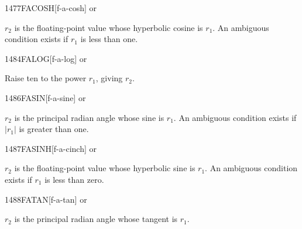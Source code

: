 \begin{newword}{1477}{FACOSH}[f-a-cosh]
	 or

	$r_2$ is the floating-point value whose hyperbolic cosine is
	$r_1$. An ambiguous condition exists if $r_1$ is less than one.
\end{newword}


\begin{newword}{1484}{FALOG}[f-a-log]
	 or

	Raise ten to the power $r_1$, giving $r_2$.
\end{newword}


\begin{newword}{1486}{FASIN}[f-a-sine]
	 or

	$r_2$ is the principal radian angle whose sine is $r_1$. An
	ambiguous condition exists if $|r_1|$ is greater than one.
\end{newword}


\begin{newword}{1487}{FASINH}[f-a-cinch]
	 or

	$r_2$ is the floating-point value whose hyperbolic sine is $r_1$.
	An ambiguous condition exists if $r_1$ is less than zero.
\end{newword}


\begin{newword}{1488}{FATAN}[f-a-tan]
	 or

	$r_2$ is the principal radian angle whose tangent is $r_1$.
\end{newword}


